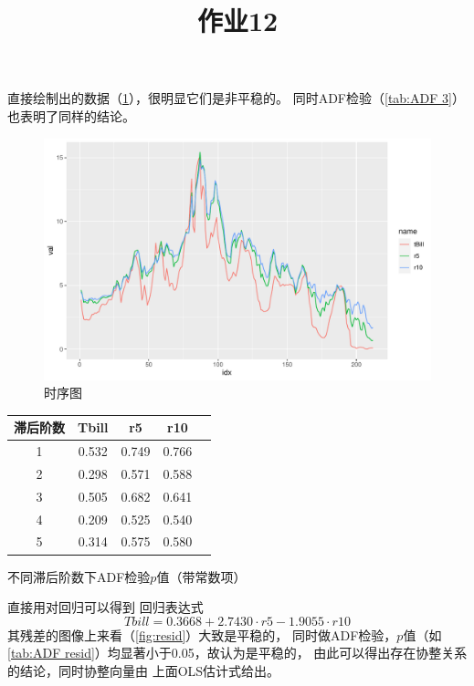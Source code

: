 \documentclass[cn]{homework}
\title{作业12}
\begin{document}
    \maketitle

    \problem[题2]
    直接绘制出的数据（\cref{fig:ts}），很明显它们是非平稳的。
    同时ADF检验（\cref{tab:ADF 3}）也表明了同样的结论。
    \begin{figure}[h]
        \centering
        \includegraphics[width=\textwidth]{ts}
        \caption{时序图}
        \label{fig:ts}
    \end{figure}

    \begin{margintable}
        \centering
        \begin{tabular}{ccccc}
            \toprule
            滞后阶数 & Tbill & r5 & r10 \\
            \midrule
            1 & 0.532 & 0.749 & 0.766 \\
            2 & 0.298 & 0.571 & 0.588 \\
            3 & 0.505 & 0.682 & 0.641 \\
            4 & 0.209 & 0.525 & 0.540 \\
            5 & 0.314 & 0.575 & 0.580 \\
            \bottomrule
        \end{tabular}
        \caption{不同滞后阶数下ADF检验$p$值（带常数项）}
        \label{tab:ADF 3}
    \end{margintable}

    直接用对回归可以得到
    回归表达式
    \[Tbill=0.3668+2.7430\cdot r5-1.9055\cdot r10\]
    其残差的图像上来看（\cref{fig:resid}）大致是平稳的，
    同时做ADF检验，$p$值（如\cref{tab:ADF resid}）均显著小于0.05，故认为是平稳的，
    由此可以得出存在协整关系的结论，同时协整向量由
    上面OLS估计式给出。
\end{document}
